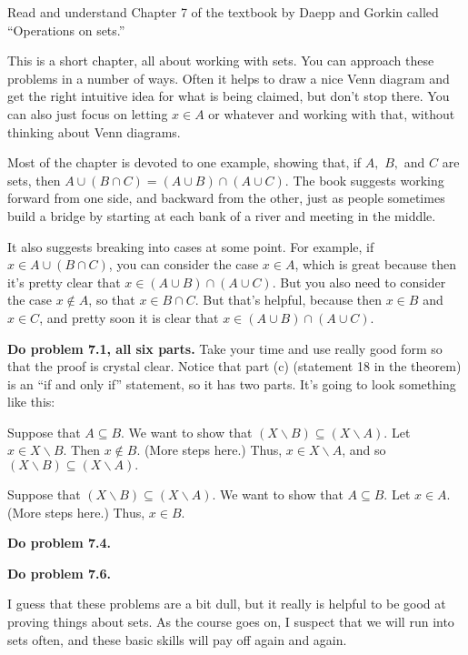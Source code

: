 
Read and understand Chapter 7 of the textbook by Daepp and Gorkin called ``Operations on sets.''

This is a short chapter, all about working with sets.
You can approach these problems in a number of ways.
Often it helps to draw a nice Venn diagram and get the right intuitive idea for what is being claimed, but don't stop there.
You can also just focus on letting $x \in A$ or whatever and working with that, without thinking about Venn diagrams.

Most of the chapter is devoted to one example, showing that, if $A,$ $B,$ and $C$ are sets, then $A \cup (B \cap C) = (A \cup B) \cap (A \cup C)$.
The book suggests working forward from one side, and backward from the other, just as people sometimes build a bridge by starting at each bank of a river and meeting in the middle.

It also suggests breaking into cases at some point.  For example, if $x \in A \cup (B \cap C)$, you can consider the case $x \in A$, which is great because then it's pretty clear that $x \in (A \cup B) \cap (A \cup C)$.  But you also need to consider the case $x \notin A$, so that $x \in B \cap C$.  But that's helpful, because then $x \in B$ and $x \in C$, and pretty soon it is clear that 
$x \in (A \cup B) \cap (A \cup C)$.

{\bf Do problem 7.1, all six parts.}  Take your time and use really good form so that the proof is crystal clear.  Notice that part (c) (statement 18 in the theorem) is an ``if and only if'' statement, so it has two parts.  It's going to look something like this:
\blist{0in}
\item Suppose that $A \subseteq B$.  We want to show that $(X \backslash B) \subseteq (X \backslash A).$  Let $x \in X \backslash B$.  Then $x \notin B$.  (More steps here.) Thus, $x \in X \backslash A$, and so $(X \backslash B) \subseteq (X \backslash A).$
\item Suppose that $(X \backslash B) \subseteq (X \backslash A).$  We want to show that $A \subseteq B$.  Let $x \in A$. (More steps here.)  Thus, $x \in B$.
\elist

{\bf Do problem 7.4.}

{\bf Do problem 7.6.}

I guess that these problems are a bit dull, but it really is helpful to be good at proving things about sets.  As the course goes on, I suspect that we will run into sets often, and these basic skills will pay off again and again.

